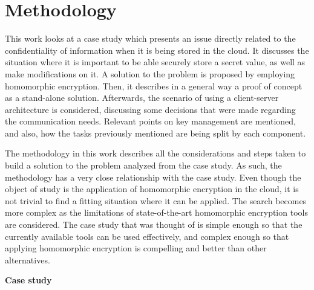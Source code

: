 \chapter{Methodology}
\label{methodology}

This work looks at a case study which presents an issue directly related to the confidentiality of information when it is being stored in the cloud. It discusses the situation where it is important to be able securely store a secret value, as well as make modifications on it. A solution to the problem is proposed by employing homomorphic encryption. Then, it describes in a general way a proof of concept as a stand-alone solution. Afterwards, the scenario of using a client-server architecture is considered, discussing some decisions that were made regarding the communication needs. Relevant points on key management are mentioned, and also, how the tasks previously mentioned are being split by each component. 

The methodology in this work describes all the considerations and steps taken to build a solution to the problem analyzed from the case study. As such, the methodology has a very close relationship with the case study. Even though the object of study is the application of homomorphic encryption in the cloud, it is not trivial to find a fitting situation where it can be applied. The search becomes more complex as the limitations of state-of-the-art homomorphic encryption tools are considered. The case study that was thought of is simple enough so that the currently available tools can be used effectively, and complex enough so that applying homomorphic encryption is compelling and better than other alternatives.

\textbf{Case study}

